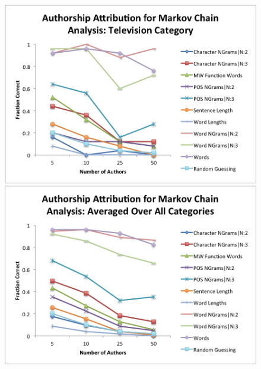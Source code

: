 \documentclass[pageno]{jpaper}
\begin{document}
\begin{figure}[h!]
\begin{center}
\includegraphics*[scale=.75]{MarkovTelevision}
\includegraphics*[scale=.75]{MarkovAll}
\end{center}
\label{fig:MarkovCategories3}
\end{figure}
\end{document}
